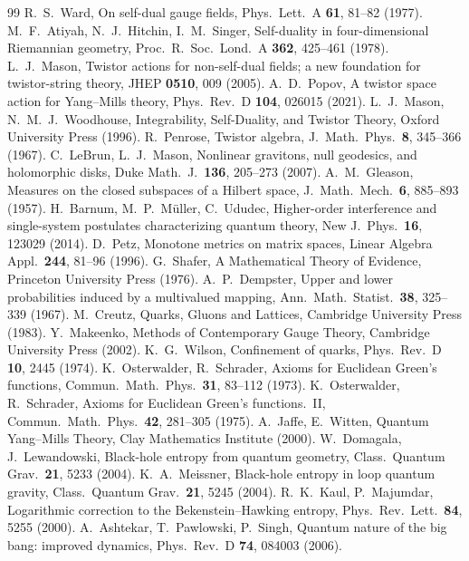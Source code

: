 \documentclass[11pt,a4paper]{article}
\theoremstyle{definition}
\theoremstyle{remark}
\begin{document}
\begin{thebibliography}{99}
 R.~S.~Ward, On self-dual gauge fields, Phys.\ Lett.\ A \textbf{61}, 81--82 (1977).
 M.~F.~Atiyah, N.~J.~Hitchin, I.~M.~Singer, Self-duality in four-dimensional Riemannian geometry, Proc.\ R.\ Soc.\ Lond.\ A \textbf{362}, 425--461 (1978).
 L.~J.~Mason, Twistor actions for non-self-dual fields; a new foundation for twistor-string theory, JHEP \textbf{0510}, 009 (2005).
 A.~D.~Popov, A twistor space action for Yang--Mills theory, Phys.\ Rev.\ D \textbf{104}, 026015 (2021).
 L.~J.~Mason, N.~M.~J.~Woodhouse, Integrability, Self-Duality, and Twistor Theory, Oxford University Press (1996).
 R.~Penrose, Twistor algebra, J.\ Math.\ Phys.\ \textbf{8}, 345--366 (1967).
 C.~LeBrun, L.~J.~Mason, Nonlinear gravitons, null geodesics, and holomorphic disks, Duke Math.\ J.\ \textbf{136}, 205--273 (2007).
 A.~M.~Gleason, Measures on the closed subspaces of a Hilbert space, J.\ Math.\ Mech.\ \textbf{6}, 885--893 (1957).
 H.~Barnum, M.~P.~M\"uller, C.~Ududec, Higher-order interference and single-system postulates characterizing quantum theory, New J.\ Phys.\ \textbf{16}, 123029 (2014).
 D.~Petz, Monotone metrics on matrix spaces, Linear Algebra Appl.\ \textbf{244}, 81--96 (1996).
 G.~Shafer, A Mathematical Theory of Evidence, Princeton University Press (1976).
 A.~P.~Dempster, Upper and lower probabilities induced by a multivalued mapping, Ann.\ Math.\ Statist.\ \textbf{38}, 325--339 (1967).
 M.~Creutz, Quarks, Gluons and Lattices, Cambridge University Press (1983).
 Y.~Makeenko, Methods of Contemporary Gauge Theory, Cambridge University Press (2002).
 K.~G.~Wilson, Confinement of quarks, Phys.\ Rev.\ D \textbf{10}, 2445 (1974).
 K.~Osterwalder, R.~Schrader, Axioms for Euclidean Green's functions, Commun.\ Math.\ Phys.\ \textbf{31}, 83--112 (1973).
 K.~Osterwalder, R.~Schrader, Axioms for Euclidean Green's functions.\ II, Commun.\ Math.\ Phys.\ \textbf{42}, 281--305 (1975).
 A.~Jaffe, E.~Witten, Quantum Yang--Mills Theory, Clay Mathematics Institute (2000).
 W.~Domagala, J.~Lewandowski, Black-hole entropy from quantum geometry, Class.\ Quantum Grav.\ \textbf{21}, 5233 (2004).
 K.~A.~Meissner, Black-hole entropy in loop quantum gravity, Class.\ Quantum Grav.\ \textbf{21}, 5245 (2004).
 R.~K.~Kaul, P.~Majumdar, Logarithmic correction to the Bekenstein--Hawking entropy, Phys.\ Rev.\ Lett.\ \textbf{84}, 5255 (2000).
 A.~Ashtekar, T.~Pawlowski, P.~Singh, Quantum nature of the big bang: improved dynamics, Phys.\ Rev.\ D \textbf{74}, 084003 (2006).


\end{thebibliography}
\end{document}
